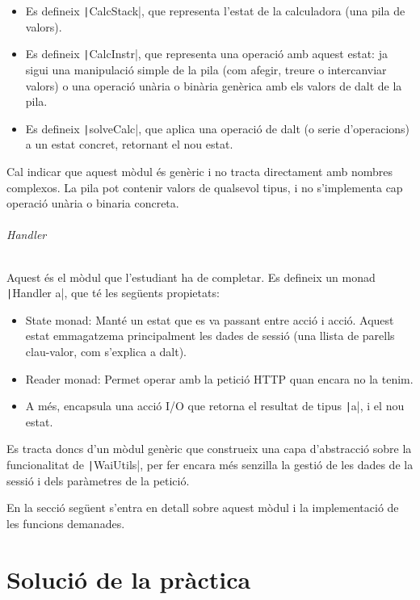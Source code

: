 \documentclass[catalan, a4paper]{scrartcl}
\begin{document}
\begin{itemize}
\item Es defineix \texttt|CalcStack|, que
representa l'estat de la calculadora (una pila de valors).
\item Es defineix \texttt|CalcInstr|, que representa
una operació amb aquest estat: ja sigui una manipulació simple
de la pila (com afegir, treure o intercanviar valors) o una operació
unària o binària genèrica amb els valors de dalt de la pila.
\item Es defineix \texttt|solveCalc|, que aplica una operació de dalt (o serie d'operacions) a un estat concret, retornant el nou estat.
\end{itemize}

Cal indicar que aquest mòdul és genèric i no tracta directament amb
nombres complexos. La pila pot contenir valors de qualsevol tipus,
i no s'implementa cap operació unària o binaria concreta.

\paragraph{Handler} Aquest és el mòdul que l'estudiant ha de completar.
Es defineix un monad \texttt|Handler a|, que té les següents propietats:

\begin{itemize}
\item State monad: Manté un estat que es va passant entre acció i acció.
Aquest estat emmagatzema principalment les dades de sessió (una llista de parells clau-valor, com
s'explica a dalt).
\item Reader monad: Permet operar amb la petició HTTP quan encara no la tenim.
\item A més, encapsula una acció I/O que retorna el resultat de tipus \texttt|a|,
i el nou estat.
\end{itemize}

Es tracta doncs d'un mòdul genèric que construeix una capa d'abstracció
sobre la funcionalitat de \texttt|WaiUtils|, per fer encara més senzilla
la gestió de les dades de la sessió i dels paràmetres de la petició.

En la secció següent s'entra en detall sobre aquest mòdul i la implementació
de les funcions demanades.

\clearpage

\part{Solució de la pràctica}
\end{document}
